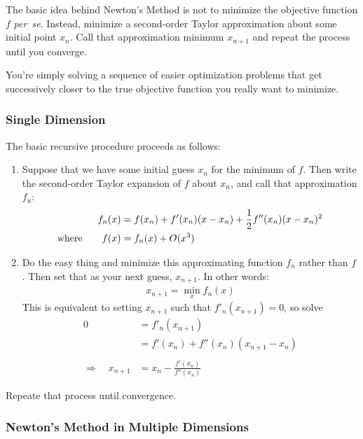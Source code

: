 \documentclass[a4paper,12pt]{scrartcl}
\theoremstyle{definition}
\theoremstyle{remark}
\begin{document}
The basic idea behind Newton's Method is not to minimize the objective
function $f$ \emph{per~se}. Instead, minimize a second-order Taylor
approximation about some initial point $x_n$. Call that approximation
minimum $x_{n+1}$ and repeat the process until you converge.

You're simply solving a  sequence of easier optimization problems that
get successively closer to the true objective function you really want
to minimize.


\subsubsection{Single Dimension}

The basic recursive procedure proceeds as follows:
\begin{enumerate}
  \item Suppose that we have some initial guess $x_n$ for the minimum of
    $f$. Then write the second-order Taylor expansion of $f$ about
    $x_n$, and call that approximation $f_n$:
    \begin{align}
      f_n(x) &= f(x_n) + f'(x_n)(x-x_n) + \frac{1}{2} f''(x_n) (x-x_n)^2\\
      \text{where} \qquad
      f(x) &= f_n(x) + O(x^3)\notag
    \end{align}
  \item Do the easy thing and minimize this approximating function $f_n$
    rather than $f$. Then set that as your next guess, $x_{n+1}$. In
    other words:
    \begin{align*}
      x_{n+1} = \min_x f_n(x)
    \end{align*}
    This is equivalent to setting $x_{n+1}$ such that $f'_n(x_{n+1})=0$,
    so solve
    \begin{align*}
      0 &= f'_n(x_{n+1})\\
      &= f'(x_n) + f''(x_n)(x_{n+1}-x_n) \\\\
      \Rightarrow \quad
      x_{n+1} &= x_n - \frac{f'(x_n)}{f''(x_n)}
    \end{align*}
\end{enumerate}
Repeate that process until convergence.


\subsubsection{Newton's Method in Multiple Dimensions}
\end{document}
